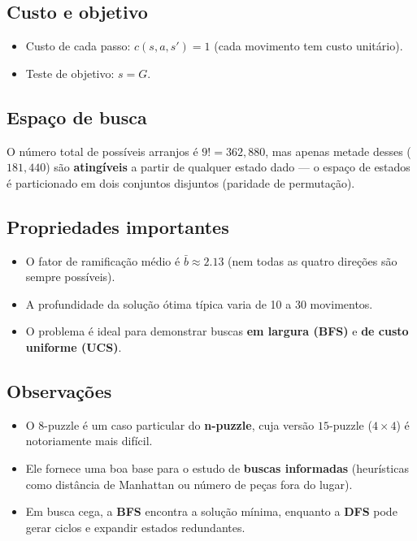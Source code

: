 \documentclass[9pt,a4paper]{extarticle}
\begin{document}
\subsection*{Custo e objetivo}

\begin{itemize}
  \item Custo de cada passo: $c(s,a,s') = 1$ (cada movimento tem custo unitário).
  \item Teste de objetivo: $s = G$.
\end{itemize}

\subsection*{Espaço de busca}

O número total de possíveis arranjos é $9! = 362{,}880$,  
mas apenas metade desses ($181{,}440$) são \textbf{atingíveis} a partir de qualquer estado dado — o espaço de estados é particionado em dois conjuntos disjuntos (paridade de permutação).

\subsection*{Propriedades importantes}

\begin{itemize}
  \item O fator de ramificação médio é $\bar{b} \approx 2.13$ (nem todas as quatro direções são sempre possíveis).
  \item A profundidade da solução ótima típica varia de 10 a 30 movimentos.
  \item O problema é ideal para demonstrar buscas \textbf{em largura (BFS)} e \textbf{de custo uniforme (UCS)}.
\end{itemize}

\subsection*{Observações}

\begin{itemize}
  \item O 8-puzzle é um caso particular do \textbf{n-puzzle}, cuja versão $15$-puzzle ($4\times4$) é notoriamente mais difícil.
  \item Ele fornece uma boa base para o estudo de \textbf{buscas informadas} (heurísticas como distância de Manhattan ou número de peças fora do lugar).
  \item Em busca cega, a \textbf{BFS} encontra a solução mínima, enquanto a \textbf{DFS} pode gerar ciclos e expandir estados redundantes.
\end{itemize}
\end{document}
